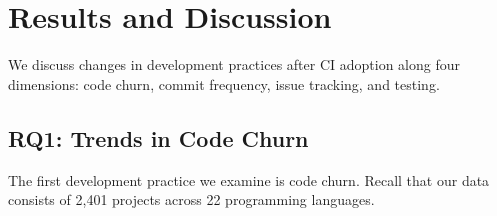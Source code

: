 
\section{Results and Discussion}
\label{sec:results}
We discuss changes in development practices after CI adoption along four 
dimensions: code churn, commit frequency, issue tracking, and testing. 

%

\subsection{RQ1: Trends in Code Churn}

The first development practice we examine is code churn.
Recall that our data consists of 2,401 projects across 22 programming languages.

